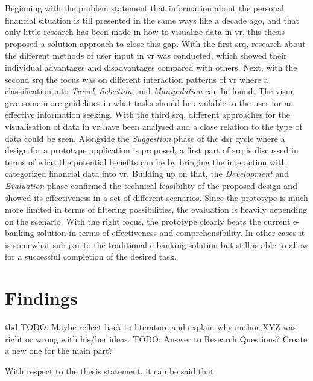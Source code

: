 Beginning with the problem statement that information about the personal financial situation is till presented in the same ways like a decade ago, and that only little research has been made in how to visualize data in \gls{vr}, this thesis proposed a solution approach to close this gap. With the first \gls{srq}, research about the different methods of user input in \gls{vr} was conducted, which showed their individual advantages and disadvantages compared with others. Next, with the second \gls{srq} the focus was on different interaction patterns of \gls{vr} where a classification into \textit{Travel}, \textit{Selection}, and \textit{Manipulation} can be found. The \gls{vism} give some more guidelines in what tasks should be available to the user for an effective information seeking. With the third \gls{srq}, different approaches for the visualisation of data in \gls{vr} have been analysed and a close relation to the type of data could be seen. Alongside the \textit{Suggestion} phase of the \gls{dsr} cycle where a design for a prototype application is proposed, a first part of \gls{srq} is discussed in terms of what the potential benefits can be by bringing the interaction with categorized financial data into \gls{vr}. Building up on that, the \textit{Development} and \textit{Evaluation} phase confirmed the technical feasibility of the proposed design and showed its effectiveness in a set of different scenarios. Since the prototype is much more limited in terms of filtering possibilities, the evaluation is heavily depending on the scenario. With the right focus, the prototype clearly beats the current e-banking solution in terms of effectiveness and comprehensibility. In other cases it is somewhat sub-par to the traditional e-banking solution but still is able to allow for a successful completion of the desired task.



\section{Findings}

tbd
TODO: Maybe reflect back to literature and explain why author XYZ was right or wrong with his/her ideas.
TODO: Answer to Research Questions? Create a new one for the main part?

With respect to the thesis statement, it can be said that
\begin{framed}
	\textit{\thesisstatementtext}
\end{framed}

